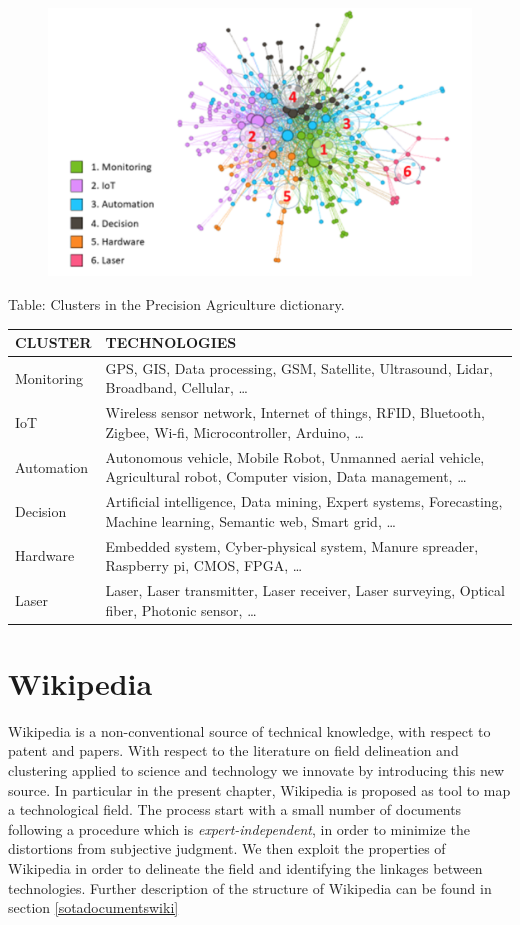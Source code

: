 \documentclass[]{book}
\begin{document}
\begin{figure}

{\centering \includegraphics[width=0.6\linewidth]{_bookdown_files/figures/precisiongraph} 

}

\end{figure}

Table: \label{tab:patab1} Clusters in the Precision Agriculture dictionary.

\begin{tabular}{l|l}
\hline
CLUSTER & TECHNOLOGIES\\
\hline
Monitoring & GPS, GIS, Data processing, GSM, Satellite, Ultrasound, Lidar, Broadband, Cellular, …\\
\hline
IoT & Wireless sensor network, Internet of things, RFID, Bluetooth, Zigbee, Wi-fi, Microcontroller, Arduino, …\\
\hline
Automation & Autonomous vehicle, Mobile Robot, Unmanned aerial vehicle, Agricultural robot, Computer vision, Data management, …\\
\hline
Decision & Artificial intelligence, Data mining, Expert systems, Forecasting, Machine learning, Semantic web, Smart grid, …\\
\hline
Hardware & Embedded system, Cyber-physical system, Manure spreader, Raspberry pi, CMOS, FPGA, …\\
\hline
Laser & Laser, Laser transmitter, Laser receiver, Laser surveying, Optical fiber, Photonic sensor, …\\
\hline
\end{tabular}

\chapter{Wikipedia}\label{wikipedia}

Wikipedia is a non-conventional source of technical knowledge, with
respect to patent and papers. With respect to the literature on field
delineation and clustering applied to science and technology we innovate
by introducing this new source. In particular in the present chapter,
Wikipedia is proposed as tool to map a technological field. The process
start with a small number of documents following a procedure which is
\emph{expert-independent}, in order to minimize the distortions from
subjective judgment. We then exploit the properties of Wikipedia in
order to delineate the field and identifying the linkages between
technologies. Further description of the structure of Wikipedia can be
found in section \ref{sotadocumentswiki}
\end{document}
